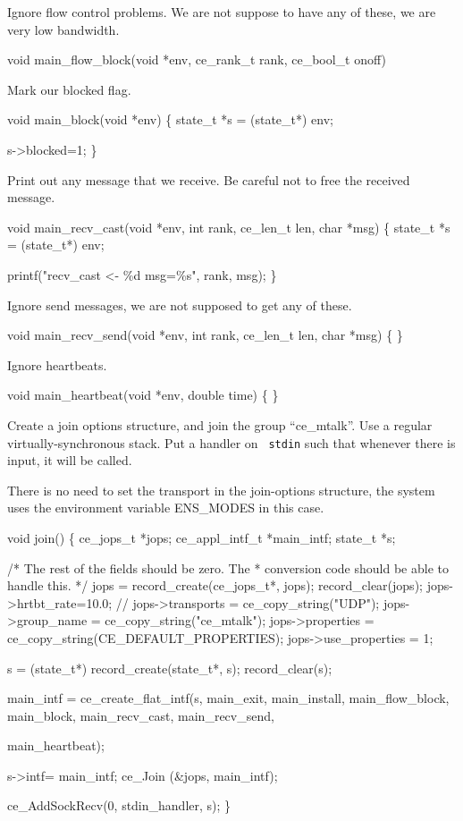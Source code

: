 Ignore flow control problems. We are not suppose to have any of 
these, we are very low bandwidth.
\begin{codebox}
void main_flow_block(void *env, ce_rank_t rank, ce_bool_t onoff){}
\end{codebox}

Mark our blocked flag. 
\begin{codebox}
void main_block(void *env) \{
  state_t *s = (state_t*) env;

  s->blocked=1;
\}
\end{codebox}

Print out any message that we receive. Be careful not to free the
received message.
\begin{codebox}
void main_recv_cast(void *env, int rank, ce_len_t len, char *msg) \{
  state_t *s = (state_t*) env;

  printf("recv_cast <- \%d msg=\%s", rank, msg);
\}
\end{codebox}

Ignore send messages, we are not supposed to get any of these.
\begin{codebox}
void main_recv_send(void *env, int rank, ce_len_t len, char *msg) \{
\}
\end{codebox}

Ignore heartbeats.
\begin{codebox}
void main_heartbeat(void *env, double time) \{ \}
\end{codebox}


Create a join options structure, and join the group ``ce\_mtalk''.
Use a regular virtually-synchronous stack. Put a handler on {\tt
stdin} such that whenever there is input, it will be called. 

There is no need to set the transport in the join-options structure,
the system uses the environment variable ENS\_MODES in this case.
\begin{codebox}
void join() \{
  ce_jops_t *jops; 
  ce_appl_intf_t *main_intf;
  state_t *s;
  
  /* The rest of the fields should be zero. The
   * conversion code should be able to handle this. 
   */
  jops = record_create(ce_jops_t*, jops);
  record_clear(jops);
  jops->hrtbt_rate=10.0;
  //  jops->transports = ce_copy_string("UDP");
  jops->group_name = ce_copy_string("ce_mtalk");
  jops->properties = ce_copy_string(CE_DEFAULT_PROPERTIES);
  jops->use_properties = 1;

  s = (state_t*) record_create(state_t*, s);
  record_clear(s);
    
  main_intf = ce_create_flat_intf(s,
			main_exit, main_install, main_flow_block,
			main_block, main_recv_cast, main_recv_send,

			     main_heartbeat);
  
  s->intf= main_intf;
  ce_Join (&jops, main_intf);
  
  ce_AddSockRecv(0, stdin_handler, s);
\}
\end{codebox}

